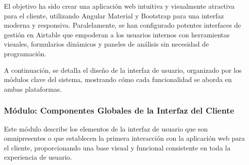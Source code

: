 El objetivo ha sido crear una aplicación web intuitiva y visualmente atractiva para el cliente, utilizando Angular Material y Bootstrap para una interfaz moderna y responsiva. Paralelamente, se han configurado potentes interfaces de gestión en Airtable que empoderan a los usuarios internos con herramientas visuales, formularios dinámicos y paneles de análisis sin necesidad de programación.

A continuación, se detalla el diseño de la interfaz de usuario, organizado por los módulos clave del sistema, mostrando cómo cada funcionalidad se aborda en ambas plataformas.


\subsubsection{Módulo: Componentes Globales de la Interfaz del Cliente}


Este módulo describe los elementos de la interfaz de usuario que son omnipresentes o que establecen la primera interacción con la aplicación web para el cliente, proporcionando una base visual y funcional consistente en toda la experiencia de usuario.

